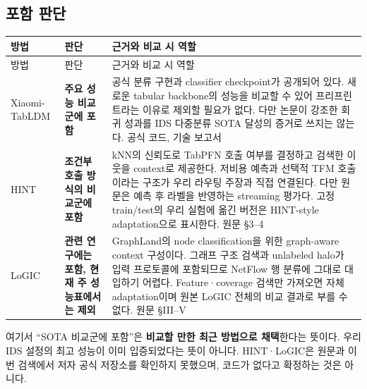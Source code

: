 \subsection{포함 판단}
\begingroup
\footnotesize
\begin{longtable}{>{\raggedright\arraybackslash}p{}>{\raggedright\arraybackslash}p{}>{\raggedright\arraybackslash}p{}}
\toprule
방법 & 판단 & 근거와 비교 시 역할 \\ \midrule
\endfirsthead
방법 & 판단 & 근거와 비교 시 역할 \\ \midrule
\endhead
{}Xiaomi-TabLDM & \textbf{주요 성능 비교군에 포함} & 공식 분류 구현과 classifier checkpoint가 공개되어 있다. 새로운 tabular backbone의 성능을 비교할 수 있어 프리프린트라는 이유로 제외할 필요가 없다. 다만 논문이 강조한 회귀 성과를 IDS 다중분류 SOTA 달성의 증거로 쓰지는 않는다. 공식 코드, 기술 보고서 \\
{}HINT & \textbf{조건부 호출 방식의 비교군에 포함} & kNN의 신뢰도로 TabPFN 호출 여부를 결정하고 검색한 이웃을 context로 제공한다. 저비용 예측과 선택적 TFM 호출이라는 구조가 우리 라우팅 주장과 직접 연결된다. 다만 원문은 예측 후 라벨을 반영하는 streaming 평가다. 고정 train/\allowbreak{}test의 우리 실험에 옮긴 버전은 HINT-style adaptation으로 표시한다. 원문 §3–4 \\
{}LoGIC & \textbf{관련 연구에는 포함, 현재 주 성능표에서는 제외} & GraphLand의 node classification을 위한 graph-aware context 구성이다. 그래프 구조 검색과 unlabeled halo가 입력 프로토콜에 포함되므로 NetFlow 행 분류에 그대로 대입하기 어렵다. Feature·coverage 검색만 가져오면 자체 adaptation이며 원본 LoGIC 전체의 비교 결과로 부를 수 없다. 원문 §III–V \\
\bottomrule
\end{longtable}
\endgroup
여기서 “SOTA 비교군에 포함”은 \textbf{비교할 만한 최근 방법으로 채택}한다는 뜻이다. 우리 IDS 설정의 최고 성능이 이미 입증되었다는 뜻이 아니다. HINT·LoGIC은 원문과 이번 검색에서 저자 공식 저장소를 확인하지 못했으며, 코드가 없다고 확정하는 것은 아니다.

